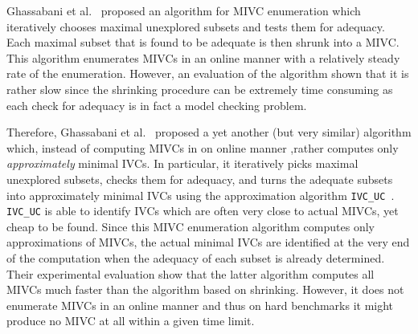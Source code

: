 Ghassabani et al.~\cite{Ghass17AllIVCs} proposed an algorithm for MIVC enumeration which iteratively chooses maximal unexplored subsets and tests them for adequacy. Each maximal subset that is found to be adequate is then shrunk into a MIVC. This algorithm enumerates MIVCs in an online manner with a relatively steady rate of the enumeration. However, an evaluation of the algorithm shown that it is rather slow since the shrinking procedure can be extremely time consuming as each check for adequacy is in fact a model checking problem.

Therefore, Ghassabani et al.~\cite{Ghass17AllIVCs} proposed a yet another (but very similar) algorithm which, instead of computing MIVCs in on online manner
,rather computes only \emph{approximately} minimal IVCs. In particular, it iteratively picks maximal unexplored subsets, checks them for adequacy, and turns the adequate subsets into approximately minimal IVCs using the approximation algorithm \texttt{IVC\_UC}~\cite{Ghass16}. \texttt{IVC\_UC} is able to identify IVCs which are often very close to actual MIVCs, yet cheap to be found. Since this MIVC enumeration algorithm computes only approximations of MIVCs, the actual minimal IVCs  are identified at the very end of the computation when the adequacy of each subset is already determined.  Their experimental evaluation show that the latter algorithm computes all MIVCs much faster than the algorithm based on shrinking. However, it does not enumerate MIVCs in an online manner and thus on hard benchmarks it might produce no MIVC at all within a given time limit.


